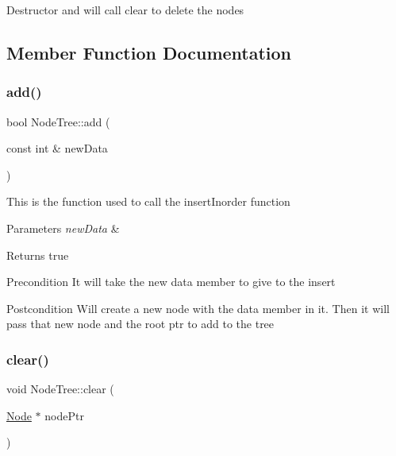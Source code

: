 Destructor and will call clear to delete the nodes 

\subsection{Member Function Documentation}
\mbox{\label{class_node_tree_a2e2cd480e0a50d94d26b09cfd721ac7a}} 
\subsubsection{\texorpdfstring{add()}{add()}}
{\footnotesize\ttfamily bool Node\+Tree\+::add (\begin{DoxyParamCaption}\item[{const int \&}]{new\+Data }\end{DoxyParamCaption})}

This is the function used to call the insert\+Inorder function 
\begin{DoxyParams}{Parameters}
{\em new\+Data} & \\
\hline
\end{DoxyParams}
\begin{DoxyReturn}{Returns}
true 
\end{DoxyReturn}
\begin{DoxyPrecond}{Precondition}
It will take the new data member to give to the insert 
\end{DoxyPrecond}
\begin{DoxyPostcond}{Postcondition}
Will create a new node with the data member in it. Then it will pass that new node and the root ptr to add to the tree 
\end{DoxyPostcond}
\mbox{\label{class_node_tree_a22be831083f6970a7ba6b64fcd0995ff}} 
\subsubsection{\texorpdfstring{clear()}{clear()}}
{\footnotesize\ttfamily void Node\+Tree\+::clear (\begin{DoxyParamCaption}\item[{\mbox{\hyperlink{class_node}{Node}} $\ast$}]{node\+Ptr }\end{DoxyParamCaption})}

